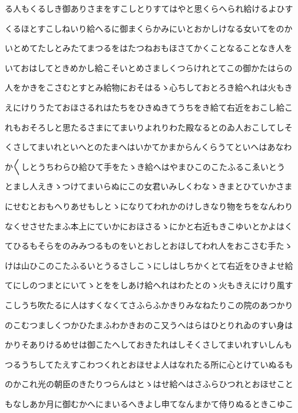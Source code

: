 \documentclass[a4paper,11pt,landscape]{ltjtarticle}
\begin{document}
\par\medskip
る人もくるしき御ありさまをすこしとりすてはやと思くらへられ給けるよひす
\par\medskip
くるほとすこしねいり給へるに御まくらかみにいとおかしけなる女いてをのか
\par\medskip
いとめてたしとみたてまつるをはたつねおもほさてかくことなることなき人を
\par\medskip
いておはしてときめかし給こそいとめさましくつらけれとてこの御かたはらの
\par\medskip
人をかきをこさむとすとみ給物におそはるゝ心ちしておとろき給へれは火もき
\par\medskip
えにけりうたておほさるれはたちをひきぬきてうちをき給て右近をおこし給こ
\par\medskip
れもおそろしと思たるさまにてまいりよれりわた殿なるとのゐ人おこしてしそ
\par\medskip
くさしてまいれといへとのたまへはいかてかまからんくらうてといへはあなわ
\par\medskip
か〱しとうちわらひ給ひて手をたゝき給へはやまひこのこたふるこゑいとう
\par\medskip
とまし人えきゝつけてまいらぬにこの女君いみしくわなゝきまとひていかさま
\par\medskip
にせむとおもへりあせもしとゝになりてわれかのけしきなり物をちをなんわり
\par\medskip
なくせさせたまふ本上にていかにおほさるゝにかと右近もきこゆいとかよはく
\par\medskip
てひるもそらをのみみつるものをいとおしとおほしてわれ人をおこさむ手たゝ
\par\medskip
けは山ひこのこたふるいとうるさしこゝにしはしちかくとて右近をひきよせ給
\par\medskip
てにしのつまとにいてゝとををしあけ給へれはわたとのゝ火もきえにけり風す
\par\medskip
こしうち吹たるに人はすくなくてさふらふかきりみなねたりこの院のあつかり
\par\medskip
のこむつましくつかひたまふわかきおのこ又うへはらはひとりれゐのすい身は
\par\medskip
かりそありけるめせは御こたへしておきたれはしそくさしてまいれすいしんも
\par\medskip
つるうちしてたえすこわつくれとおほせよ人はなれたる所に心とけていぬるも
\par\medskip
のかこれ光の朝臣のきたりつらんはとゝはせ給へはさふらひつれとおほせこと
\par\medskip
もなしあか月に御むかへにまいるへきよし申てなんまかて侍りぬるときこゆこ
\end{document}

